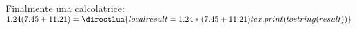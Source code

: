 \documentclass{article}
\newcommand\expr[1]{\directlua{
    local result = #1
    tex.print(tostring(result))
}}
\begin{document}
Finalmente una calcolatrice: \( 1.24 (7.45 + 11.21) = \expr{1.24*(7.45 + 11.21)}\)
\end{document}
